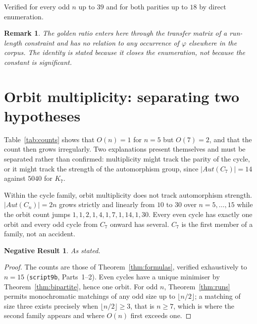 \documentclass[11pt,a4paper]{article}
\def\mathrm#1{#1}%
\newtheorem{remark}[theorem]{Remark}
\newtheorem{negresult}[theorem]{Negative Result}
\newcommand{\Aut}{\mathrm{Aut}}
\begin{document}
Verified for every odd $n$ up to $39$ and for both parities up to $18$ by direct enumeration.

\begin{remark}
\label{rem:phi}
The golden ratio enters here through the transfer matrix of a run-length constraint and has no relation to any occurrence of $\varphi$ elsewhere in the corpus. The identity is stated because it closes the enumeration, not because the constant is significant.
\end{remark}

\section{Orbit multiplicity: separating two hypotheses}
\label{sec:orbits}

Table~\ref{tab:counts} shows that $O(n)=1$ for $n=5$ but $O(7)=2$, and that the count then grows irregularly. Two explanations present themselves and must be separated rather than confirmed: multiplicity might track the parity of the cycle, or it might track the strength of the automorphism group, since $|\Aut(C_7)|=14$ against $5040$ for $K_7$.

\begin{negbox}
Within the cycle family, orbit multiplicity does not track automorphism strength. $|\Aut(C_n)|=2n$ grows strictly and linearly from $10$ to $30$ over $n=5,\dots,15$ while the orbit count jumps $1,1,2,1,4,1,7,1,14,1,30$. Every even cycle has exactly one orbit and every odd cycle from $C_7$ onward has several. $C_7$ is the first member of a family, not an accident.
\end{negbox}

\begin{negresult}
\label{neg:haut}
As stated.
\end{negresult}

\begin{proof}
The counts are those of Theorem~\ref{thm:formulas}, verified exhaustively to $n=15$ (\texttt{script9b}, Parts~1--2). Even cycles have a unique minimiser by Theorem~\ref{thm:bipartite}, hence one orbit. For odd $n$, Theorem~\ref{thm:runs} permits monochromatic matchings of any odd size up to $\lfloor n/2\rfloor$; a matching of size three exists precisely when $\lfloor n/2\rfloor\ge3$, that is $n\ge7$, which is where the second family appears and where $O(n)$ first exceeds one.
\end{proof}
\end{document}
